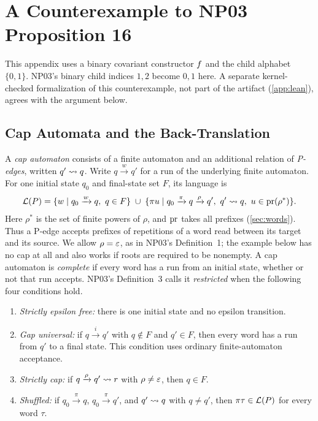 \section{A Counterexample to NP03 Proposition 16}
\label{app:np03}

This appendix uses a binary covariant constructor $f$ and the child
alphabet $\{0,1\}$. NP03's binary child indices $1,2$ become $0,1$ here.
A separate kernel-checked formalization of this counterexample, not part
of the artifact (\cref{app:lean}), agrees with the argument below.

\subsection{Cap Automata and the Back-Translation}

A \emph{cap automaton} consists of a finite automaton and an additional relation
of \emph{P-edges}, written $q'\rightsquigarrow q$. Write
$q\xrightarrow{w}q'$ for a run of the underlying finite automaton.
For one initial state $q_0$ and final-state set $F$, its language is
\[
\mathcal{L}(P)=
 \{w\mid q_0\xrightarrow{w}q,\ q\in F\}
 \;\cup\;
 \{\pi u\mid q_0\xrightarrow{\pi}q\xrightarrow{\rho}q',\
              q'\rightsquigarrow q,\ u\in\operatorname{pr}(\rho^*)\}.
\]
Here $\rho^*$ is the set of finite powers of $\rho$, and $\operatorname{pr}$ takes all
prefixes (\cref{sec:words}). Thus a P-edge accepts prefixes of repetitions of a word read
between its target and its source. We allow $\rho=\varepsilon$, as in NP03's
Definition~1; the example below has no cap at all and also works if roots
are required to be nonempty.
A cap automaton is \emph{complete} if every word has a run from an initial
state, whether or not that run accepts. NP03's Definition~3 calls it
\emph{restricted} when the following four conditions hold.
\begin{enumerate}[leftmargin=*,nosep]
\item \emph{Strictly epsilon free:} there is one initial state and no
epsilon transition.
\item \emph{Gap universal:} if $q\xrightarrow{i}q'$ with $q\notin F$
and $q'\in F$, then every word has a run from $q'$ to a final state.
This condition uses ordinary finite-automaton acceptance.
\item \emph{Strictly cap:} if
$q\xrightarrow{\rho}q'\rightsquigarrow r$ with $\rho\ne\varepsilon$, then $q\in F$.
\item \emph{Shuffled:} if
$q_0\xrightarrow{\pi}q$, $q_0\xrightarrow{\pi}q'$, and
$q'\rightsquigarrow q$ with $q\ne q'$, then $\pi\tau\in\mathcal{L}(P)$ for every word
$\tau$.
\end{enumerate}

